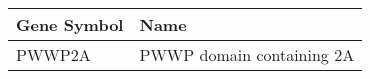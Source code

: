 \begin{tabular}{ll}
\toprule
Gene Symbol &                      Name \\
\midrule
     PWWP2A & PWWP domain containing 2A \\
\bottomrule
\end{tabular}
